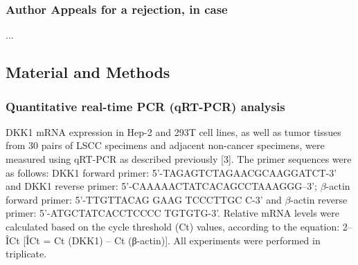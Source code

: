 \documentclass[preprint,12pt]{elsarticle}
\newenvironment{MyColorPar}[1]{%
    \leavevmode\color{#1}\ignorespaces%
}{%
}%
\begin{document}
\begin{MyColorPar}{blue}


\pagebreak

\subsubsection*{Author Appeals for a rejection, in case}

...





\subsection*{Material and Methods}

\subsubsection{Quantitative real-time PCR (qRT-PCR) analysis}

DKK1 mRNA expression in Hep-2 and 293T cell lines, as well as tumor tissues from 30 pairs of LSCC specimens and adjacent non-cancer specimens, were measured using qRT-PCR as described previously [3]. The primer sequences were as follows: DKK1 forward primer: 5'-TAGAGTCTAGAACGCAAGGATCT-3' and DKK1 reverse primer: 5'-CAAAAACTATCACAGCCTAAAGGG--3'; $\beta$-actin forward primer: 5'-TTGTTACAG GAAG TCCCTTGC C-3' and $\beta$-actin reverse primer: 5'-ATGCTATCACCTCCCC TGTGTG-3'. Relative mRNA levels were calculated based on the cycle threshold (Ct) values, according to the equation: 2–ÎCt [ÎCt = Ct (DKK1) – Ct (β-actin)]. 
All experiments were performed in triplicate.\cite{Shi2014}


\end{MyColorPar}
\end{document}
